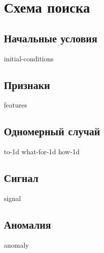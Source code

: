 \section[Схема]{Схема поиска}

\subsection{Начальные условия}

{initial-conditions}

\subsection{Признаки}

{features}

\subsection{Одномерный случай}

{to-1d}
{what-for-1d}
{how-1d}

\subsection{Сигнал}

{signal}

\subsection{Аномалия}

{anomaly}
